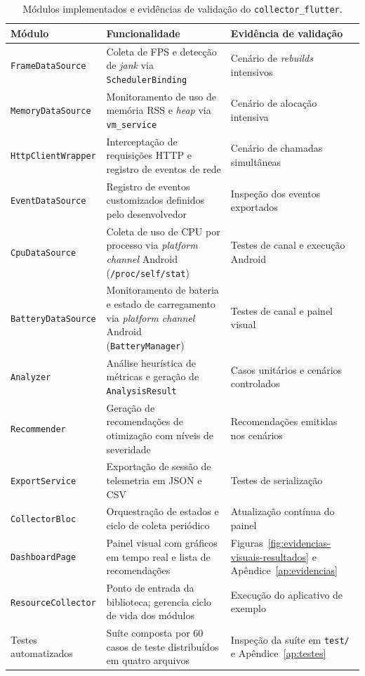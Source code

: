 \begin{table}[H]
\centering
\caption{Módulos implementados e evidências de validação do \texttt{collector\_flutter}.}
\label{tab:modulos-implementados}
\small
\renewcommand{\arraystretch}{1.3}
\begin{tabular}{|p{4cm}|p{6cm}|p{4cm}|}
\hline
\textbf{Módulo} & \textbf{Funcionalidade} & \textbf{Evidência de validação} \\
\hline
\texttt{FrameDataSource}  & Coleta de FPS e detecção de \textit{jank} via \texttt{SchedulerBinding} & Cenário de \textit{rebuilds} intensivos \\
\hline
\texttt{MemoryDataSource} & Monitoramento de uso de memória RSS e \textit{heap} via \texttt{vm\_service} & Cenário de alocação intensiva \\
\hline
\texttt{HttpClientWrapper} & Interceptação de requisições HTTP e registro de eventos de rede & Cenário de chamadas simultâneas \\
\hline
\texttt{EventDataSource}  & Registro de eventos customizados definidos pelo desenvolvedor & Inspeção dos eventos exportados \\
\hline
\texttt{CpuDataSource}    & Coleta de uso de CPU por processo via \textit{platform channel} Android (\texttt{/proc/self/stat}) & Testes de canal e execução Android \\
\hline
\texttt{BatteryDataSource} & Monitoramento de bateria e estado de carregamento via \textit{platform channel} Android (\texttt{BatteryManager}) & Testes de canal e painel visual \\
\hline
\texttt{Analyzer}         & Análise heurística de métricas e geração de \texttt{AnalysisResult} & Casos unitários e cenários controlados \\
\hline
\texttt{Recommender}      & Geração de recomendações de otimização com níveis de severidade & Recomendações emitidas nos cenários \\
\hline
\texttt{ExportService}    & Exportação de sessão de telemetria em JSON e CSV & Testes de serialização \\
\hline
\texttt{CollectorBloc}    & Orquestração de estados e ciclo de coleta periódico & Atualização contínua do painel \\
\hline
\texttt{DashboardPage}    & Painel visual com gráficos em tempo real e lista de recomendações & Figuras~\ref{fig:evidencias-visuais-resultados} e Apêndice~\ref{ap:evidencias} \\
\hline
\texttt{ResourceCollector} & Ponto de entrada da biblioteca; gerencia ciclo de vida dos módulos & Execução do aplicativo de exemplo \\
\hline
Testes automatizados      & Suíte composta por 60 casos de teste distribuídos em quatro arquivos & Inspeção da suíte em \texttt{test/} e Apêndice~\ref{ap:testes} \\
\hline
\end{tabular}
\end{table}

